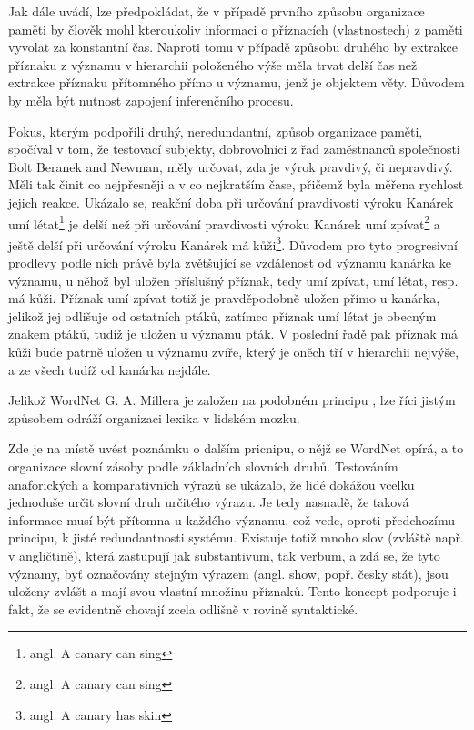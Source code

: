 \documentclass[a4paper, 11pt, oneside]{book}
\newcommand{\td}[2][]{
	{\todo[size=\footnotesize]{#2}}
}
\newcommand\ex{\textsf}
\begin{document}
				Jak \textcite{collins1969retrieval} dále uvádí, lze předpokládat, že v případě prvního způsobu organizace paměti by člověk mohl kteroukoliv informaci o příznacích (vlastnostech) z paměti vyvolat za konstantní čas. Naproti tomu v případě způsobu druhého by extrakce příznaku z významu v hierarchii položeného výše měla trvat delší čas než extrakce příznaku přítomného přímo u významu, jenž je objektem věty. Důvodem by měla být nutnost zapojení inferenčního procesu.

				Pokus, kterým podpořili \textcite{collins1969retrieval} druhý, neredundantní, způsob organizace paměti, spočíval v tom, že testovací subjekty, dobrovolníci z řad zaměstnanců společnosti Bolt Beranek and Newman, měly určovat, zda je výrok pravdivý, či nepravdivý. Měli tak činit co nejpřesněji a v co nejkratším čase, přičemž byla měřena rychlost jejich reakce. Ukázalo se, reakční doba při určování pravdivosti výroku \ex{Kanárek umí létat}\footnote{angl. \ex{A canary can sing}} je delší než při určování pravdivosti výroku \ex{Kanárek umí zpívat}\footnote{angl. \ex{A canary can sing}} a ještě delší při určování výroku \ex{Kanárek má kůži}\footnote{angl. \ex{A canary has skin}}. Důvodem pro tyto progresivní prodlevy podle nich právě byla zvětšující se vzdálenost od významu \ex{kanárka} ke významu, u něhož byl uložen příslušný příznak, tedy \ex{umí zpívat}, \ex{umí létat}, resp. \ex{má kůži}. Příznak \ex{umí zpívat} totiž je pravděpodobně uložen přímo u \ex{kanárka}, jelikož jej odlišuje od ostatních ptáků, zatímco příznak \ex{umí létat} je obecným znakem ptáků, tudíž je uložen u významu \ex{pták}. V poslední řadě pak příznak \ex{má kůži} bude patrně uložen u významu \ex{zvíře}, který je oněch tří v hierarchii nejvýše, a ze všech tudíž od kanárka nejdále.

				Jelikož WordNet G. A. Millera je založen na podobném principu\td{cit}, lze říci jistým způsobem odráží organizaci lexika v lidském mozku.

				Zde je na místě uvést poznámku o dalším pricnipu, o nějž se WordNet opírá, a to organizace slovní zásoby podle základních slovních druhů. Testováním anaforických a komparativních výrazů se ukázalo, že lidé dokážou vcelku jednoduše určit slovní druh určitého výrazu. Je tedy nasnadě, že taková informace musí být přítomna u každého významu, což vede, oproti předchozímu principu, k jisté redundantnosti systému. Existuje totiž mnoho slov (zvláště např. v angličtině), která zastupují jak substantivum, tak verbum, a zdá se, že tyto významy, byť označovány stejným výrazem (angl. \ex{show}, popř. česky \ex{stát}), jsou uloženy zvlášt a mají svou vlastní množinu příznaků. Tento koncept podporuje i fakt, že se evidentně chovají zcela odlišně v rovině syntaktické.\textcite{miller1990introduction}
\end{document}
